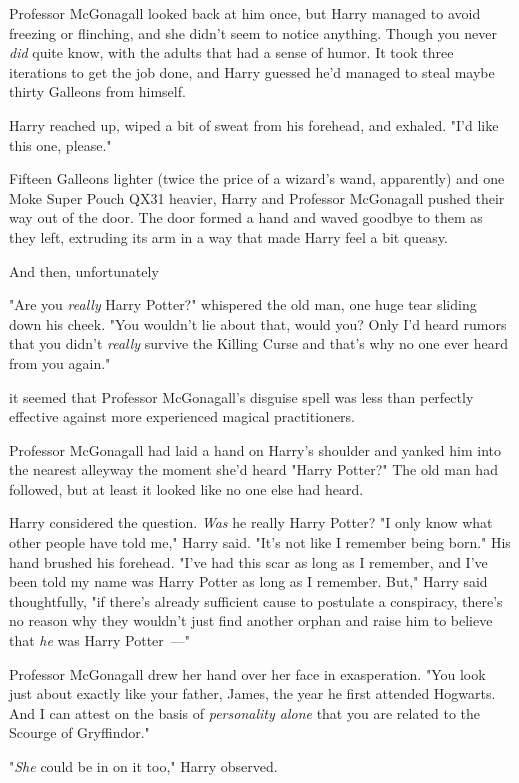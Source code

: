 Professor McGonagall looked back at him once, but Harry managed to avoid
freezing or flinching, and she didn't seem to notice anything. Though you never
\emph{did} quite know, with the adults that had a sense of humor. It took
three iterations to get the job done, and Harry guessed he'd managed to steal
maybe thirty Galleons from himself.

Harry reached up, wiped a bit of sweat from his forehead, and exhaled. "I'd
like this one, please."

Fifteen Galleons lighter (twice the price of a wizard's wand, apparently) and
one Moke Super Pouch QX31 heavier, Harry and Professor McGonagall pushed their
way out of the door. The door formed a hand and waved goodbye to them as they
left, extruding its arm in a way that made Harry feel a bit queasy.

And then, unfortunately{\el}

"Are you \emph{really} Harry Potter?" whispered the old man, one huge tear
sliding down his cheek. "You wouldn't lie about that, would you? Only I'd heard
rumors that you didn't \emph{really} survive the Killing Curse and that's why
no one ever heard from you again."

{\el} it seemed that Professor McGonagall's disguise spell was less than
perfectly effective against more experienced magical practitioners.

Professor McGonagall had laid a hand on Harry's shoulder and yanked him into
the nearest alleyway the moment she'd heard "Harry Potter?" The old man had
followed, but at least it looked like no one else had heard.

Harry considered the question. \emph{Was} he really Harry Potter? "I only know
what other people have told me," Harry said. "It's not like I remember being
born." His hand brushed his forehead. "I've had this scar as long as I
remember, and I've been told my name was Harry Potter as long as I remember.
But," Harry said thoughtfully, "if there's already sufficient cause to
postulate a conspiracy, there's no reason why they wouldn't just find another
orphan and raise him to believe that \emph{he} was Harry Potter~---"

Professor McGonagall drew her hand over her face in exasperation. "You look
just about exactly like your father, James, the year he first attended
Hogwarts. And I can attest on the basis of \emph{personality alone} that you
are related to the Scourge of Gryffindor."

"\emph{She} could be in on it too," Harry observed.

